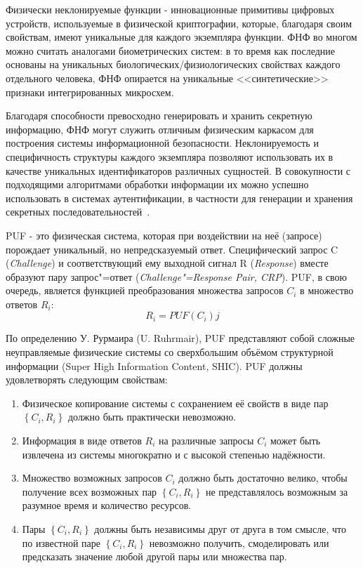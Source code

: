 Физически неклонируемые функции - инновационные примитивы цифровых устройств, используемые в физической криптографии, которые, благодаря своим свойствам, имеют уникальные для каждого экземпляра функции. ФНФ во многом можно считать аналогами биометрических систем: в то время как последние основаны на уникальных биологических/физиологических свойствах каждого отдельного человека, ФНФ опирается на уникальные <<синтетические>> признаки интегрированных микросхем.

Благодаря способности превосходно генерировать и хранить секретную информацию, ФНФ могут служить отличным физическим каркасом для построения системы информационной безопасности. Неклонируемость и специфичность структуры каждого экземпляра позволяют использовать их в качестве уникальных идентификаторов различных сущностей. В совокупности с подходящими алгоритмами обработки информации их можно успешно использовать в системах аутентификации, в частности для генерации и хранения секретных последовательностей~\cite{counterfeit_ics}.


\def\crp {\left\{C_i, R_i\right\}}

PUF - это физическая система, которая при воздействии на неё (запросе) порождает уникальный, но непредсказуемый ответ. Специфический запрос C (\emph{Challenge}) и соответствующий ему выходной сигнал R (\emph{Response}) вместе образуют пару запрос"=ответ (\emph{Challenge"={}Response Pair, CRP}). PUF, в свою очередь, является функцией преобразования множества запросов $ C_i $ в множество ответов $ R_i $:
\begin{equation}
  \label{eq:domain:pufs:puf_main}
  R_i = PUF(C_i)j
\end{equation}

По определению У. Рурмаира (U. Ruhrmair), PUF представляют собой сложные неуправляемые физические системы со сверхбольшим объёмом структурной информации (Super High Information Content, SHIC). PUF должны удовлетворять следующим свойствам:
\begin{enumerate}
  \item Физическое копирование системы с сохранением её свойств в виде пар $ \crp $ должно быть практически невозможно.
  \item Информация в виде ответов $ R_i $ на различные запросы $ C_i $ может быть извлечена из системы многократно и с высокой степенью надёжности.
  \item Множество возможных запросов $ C_i $ должно быть достаточно велико, чтобы получение всех возможных пар $ \crp $ не представлялось возможным за разумное время и количество ресурсов.
  \item Пары $ \crp $ должны быть независимы друг от друга в том смысле, что по известной паре $ \crp $ невозможно получить, смоделировать или предсказать значение любой другой пары или множества пар.
\end{enumerate}

